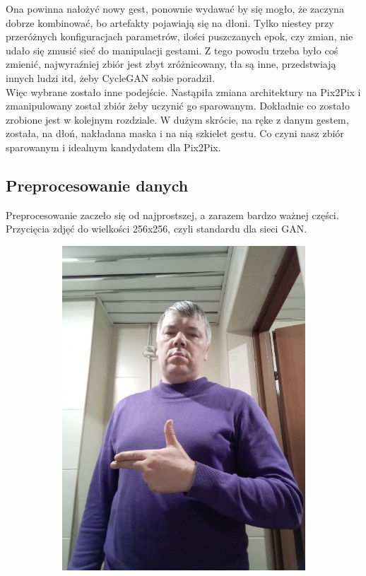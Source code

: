 \documentclass[12pt]{article}
\begin{document}
\begin{sloppypar}
{{    Ona powinna nałożyć nowy gest, ponownie wydawać by się mogło, że zaczyna dobrze kombinować, bo artefakty pojawiają się na dłoni. 
    Tylko niestey przy przeróżnych konfiguracjach parametrów, ilości puszczanych epok, czy zmian, nie udało się zmusić sieć do manipulacji gestami.
    Z tego powodu trzeba było coś zmienić, najwyraźniej zbiór jest zbyt zróżnicowany, tła są inne, przedstwiają innych ludzi itd, żeby CycleGAN sobie poradził. \\
    Więc wybrane zostało inne podejście. Nastąpiła zmiana architektury na Pix2Pix i zmanipulowany został zbiór żeby uczynić go sparowanym. 
    Dokładnie co zostało zrobione jest w kolejnym rozdziale. W dużym skrócie, na ręke z danym gestem, została, na dłoń, nakładana maska i na nią szkielet gestu.
    Co czyni nasz zbiór sparowanym i idealnym kandydatem dla Pix2Pix.
  }
  \subsection{Preprocesowanie danych}
  {
    Preprocesowanie zaczeło się od najprostszej, a zarazem bardzo ważnej części. Przycięcia zdjęć do wielkości 256x256, czyli standardu dla sieci GAN.
    \begin{figure}
      \begin{subfigure}{.5\textwidth}
        \centering
        \includegraphics[width=.8\linewidth]{orig.jpg}

\end{subfigure}
\end{figure}}}
\end{sloppypar}
\end{document}
